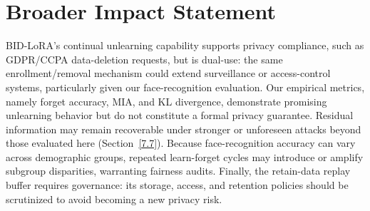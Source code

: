 \section*{Broader Impact Statement}
BID-LoRA's continual unlearning capability supports privacy compliance, such as GDPR/CCPA data-deletion requests, but is dual-use: the same enrollment/removal mechanism could extend surveillance or access-control systems, particularly given our face-recognition evaluation. Our empirical metrics, namely forget accuracy, MIA, and KL divergence, demonstrate promising unlearning behavior but do not constitute a formal privacy guarantee. Residual information may remain recoverable under stronger or unforeseen attacks beyond those evaluated here (Section~\ref{7.7}). Because face-recognition accuracy can vary across demographic groups, repeated learn-forget cycles may introduce or amplify subgroup disparities, warranting fairness audits. Finally, the retain-data replay buffer requires governance: its storage, access, and retention policies should be scrutinized to avoid becoming a new privacy risk.
